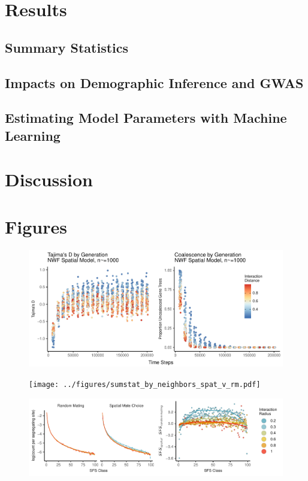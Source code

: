 \documentclass[12pt]{amsart}
\begin{document}
\section{Results}

\subsection{ Summary Statistics }

\subsection{ Impacts on Demographic Inference and GWAS }

\subsection{ Estimating Model Parameters with Machine Learning }


\section{ Discussion } 

\section{Figures}


\begin{figure}[h]
	\centerline{
	\includegraphics{../figures/10kouts_coalescence_by_generation}
	}
\end{figure}


\begin{figure}[h]
	\centerline{
	\texttt{[image: ../figures/sumstat\_by\_neighbors\_spat\_v\_rm.pdf]}
	}
\end{figure}

\begin{figure}[h]
	\centerline{
	\includegraphics{../figures/sfs_spatial_v_rm.pdf}
	}
\end{figure}
\end{document}
